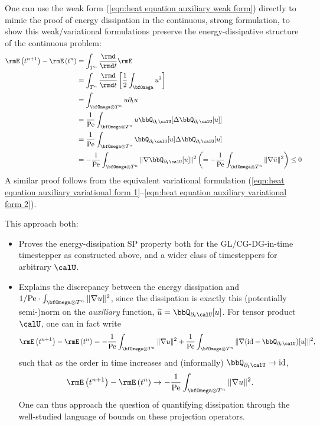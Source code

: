     One can use the weak form (\ref{eqn:heat equation auxiliary weak form}) directly to mimic the proof of energy dissipation in the continuous, strong formulation, to show this weak/variational formulations preserve the energy-dissipative structure of the continuous problem:
    \begin{align}
        \rmE\left(t^{n + 1}\right) - \rmE\left(t^{n}\right)  &=  \int_{T^{n}}\frac{\rmd}{\rmd t}\rmE  \\
        &=  \int_{T^{n}}\frac{\rmd}{\rmd t}\left[\frac{1}{2}\int_{\bfOmega}u^{2}\right]  \\
        &=  \int_{\bfOmega\otimes T^{n}}u\partial_{t}u  \\
        &=  \frac{1}{\rmPe}\int_{\bfOmega\otimes T^{n}}u\bbQ_{\partial_{t}\calU}[\Delta\bbQ_{\partial_{t}\calU}[u]]  \\
        &=  \frac{1}{\rmPe}\int_{\bfOmega\otimes T^{n}}\bbQ_{\partial_{t}\calU}[u]\Delta\bbQ_{\partial_{t}\calU}[u]  \\
        &=  - \frac{1}{\rmPe}\int_{\bfOmega\otimes T^{n}}\|\nabla\bbQ_{\partial_{t}\calU}[u]\|^{2}  \left(=  - \frac{1}{\rmPe}\int_{\bfOmega\otimes T^{n}}\|\nabla\widetilde{u}\|^{2}\right)  \leq  0
    \end{align}
    A similar proof follows from the equivalent variational formulation (\ref{eqn:heat equation auxiliary variational form 1}--\ref{eqn:heat equation auxiliary variational form 2}).

    This approach both:
    \begin{itemize}
        \item  Proves the energy-dissipation SP property both for the GL/CG-DG-in-time timestepper as constructed above, and a wider class of timesteppers for arbitrary $\calU$. 
        \item  Explains the discrepancy between the energy dissipation and $1/\rmPe\cdot\int_{\bfOmega\otimes T^{n}}\|\nabla u\|^{2}$, since the dissipation is exactly this (potentially semi-)norm on the \emph{auxiliary} function, $\widetilde{u}  =  \bbQ_{\partial_{t}\calU}[u]$. For tensor product $\calU$, one can in fact write
        \begin{equation}
            \rmE\left(t^{n + 1}\right) - \rmE\left(t^{n}\right)  =  - \frac{1}{\rmPe}\int_{\bfOmega\otimes T^{n}}\|\nabla u\|^{2} + \frac{1}{\rmPe}\int_{\bfOmega\otimes T^{n}}\|\nabla(\id - \bbQ_{\partial_{t}\calU})[u]\|^{2},
        \end{equation}
        such that as the order in time increases and (informally) $\bbQ_{\partial_{t}\calU}  \rightarrow  \id$,
        \begin{equation}
            \rmE\left(t^{n + 1}\right) - \rmE\left(t^{n}\right)  \rightarrow  - \frac{1}{\rmPe}\int_{\bfOmega\otimes T^{n}}\|\nabla u\|^{2}.
        \end{equation}
        One can thus approach the question of quantifying dissipation through the well-studied language of bounds on these projection operators.
    \end{itemize}

    